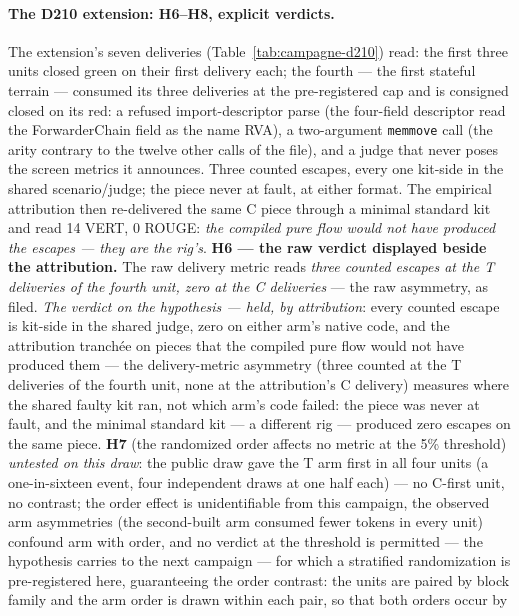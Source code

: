 \documentclass[11pt,a4paper]{article}
\newcommand{\code}[1]{\texttt{\small #1}}
\begin{document}
\paragraph{The D210 extension: H6--H8, explicit verdicts.} The
extension's seven deliveries (Table~\ref{tab:campagne-d210}) read:
the first three units closed green on their first delivery each; the
fourth --- the first stateful terrain --- consumed its three
deliveries at the pre-registered cap and is consigned closed on its
red: a refused import-descriptor parse (the four-field descriptor
read the ForwarderChain field as the name RVA), a two-argument
\code{memmove} call (the arity contrary to the twelve other calls of
the file), and a judge that never poses the screen metrics it
announces. Three counted escapes, every one kit-side in the shared
scenario/judge; the piece never at fault, at either format. The
empirical attribution then re-delivered the same C piece through a
minimal standard kit and read 14 VERT, 0 ROUGE: \emph{the compiled
pure flow would not have produced the escapes --- they are the
rig's}. \textbf{H6 --- the raw verdict displayed beside the attribution.}
The raw delivery metric reads \emph{three counted escapes at the T
deliveries of the fourth unit, zero at the C deliveries} --- the raw
asymmetry, as filed. \emph{The verdict on the hypothesis --- held,
by attribution}:
every counted escape is kit-side in the shared judge, zero on either
arm's native code, and the attribution tranch\'ee on pieces that the
compiled pure flow would not have produced them --- the
delivery-metric asymmetry (three counted at the T deliveries of the
fourth unit, none at the attribution's C delivery) measures where the
shared faulty kit ran, not which arm's code failed: the piece was
never at fault, and the minimal standard kit --- a different rig ---
produced zero escapes on the same piece. \textbf{H7} (the randomized
order affects no metric at the 5\% threshold) \emph{untested on this
draw}: the public draw gave the T arm first in all four units (a
one-in-sixteen event, four independent draws at one half each) --- no
C-first unit, no contrast; the order effect is unidentifiable from
this campaign, the observed arm asymmetries (the second-built arm
consumed fewer tokens in every unit) confound arm with order, and no
verdict at the threshold is permitted --- the hypothesis carries to the next campaign --- for which a
stratified randomization is pre-registered here, guaranteeing the
order contrast: the units are paired by block family and the arm
order is drawn within each pair, so that both orders occur by
\end{document}
